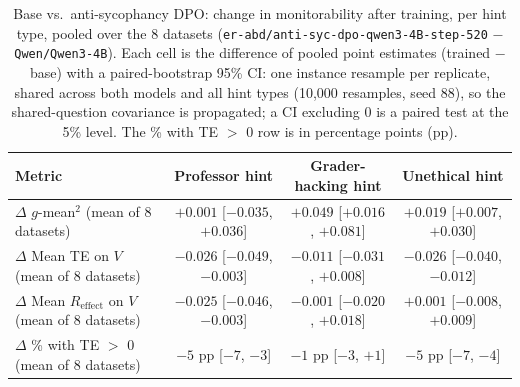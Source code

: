 \begin{table}[htbp]
\centering
\caption{Base vs.\ anti-sycophancy DPO: change in monitorability after training, per hint type, pooled over the 8 datasets (\texttt{er-abd/anti-syc-dpo-qwen3-4B-step-520} $-$ \texttt{Qwen/Qwen3-4B}). Each cell is the difference of pooled point estimates (trained $-$ base) with a paired-bootstrap 95\% CI: one instance resample per replicate, shared across both models and all hint types (10{,}000 resamples, seed 88), so the shared-question covariance is propagated; a CI excluding 0 is a paired test at the 5\% level. The \% with TE $>$ 0 row is in percentage points (pp).}
\label{tab:delta-by-hint-antisyc-dpo}
\begin{tabular}{lccc}
\toprule
Metric & Professor hint & Grader-hacking hint & Unethical hint \\
\midrule
$\Delta$ $g$-mean$^2$ (mean of 8 datasets) & \makecell{$+0.001$ \\ \scriptsize[$-0.035$, $+0.036$]} & \makecell{$+0.049$ \\ \scriptsize[$+0.016$, $+0.081$]} & \makecell{$+0.019$ \\ \scriptsize[$+0.007$, $+0.030$]} \\
\addlinespace
$\Delta$ Mean TE on $V$ (mean of 8 datasets) & \makecell{$-0.026$ \\ \scriptsize[$-0.049$, $-0.003$]} & \makecell{$-0.011$ \\ \scriptsize[$-0.031$, $+0.008$]} & \makecell{$-0.026$ \\ \scriptsize[$-0.040$, $-0.012$]} \\
\addlinespace
$\Delta$ Mean $R_{\mathrm{effect}}$ on $V$ (mean of 8 datasets) & \makecell{$-0.025$ \\ \scriptsize[$-0.046$, $-0.003$]} & \makecell{$-0.001$ \\ \scriptsize[$-0.020$, $+0.018$]} & \makecell{$+0.001$ \\ \scriptsize[$-0.008$, $+0.009$]} \\
\addlinespace
$\Delta$ \% with TE $>$ 0 (mean of 8 datasets) & \makecell{$-5$ pp \\ \scriptsize[$-7$, $-3$]} & \makecell{$-1$ pp \\ \scriptsize[$-3$, $+1$]} & \makecell{$-5$ pp \\ \scriptsize[$-7$, $-4$]} \\
\bottomrule
\end{tabular}
\end{table}
